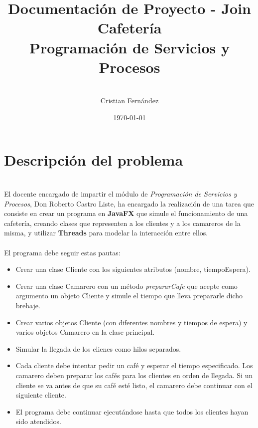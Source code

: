 \documentclass[12pt, a4paper, titlepage]{article}
\title{\LARGE \textbf{Documentación de Proyecto - Join Cafetería} \\[2ex] \Large Programación de Servicios y Procesos}
\author{\\[20ex]Cristian Fernández}
\date{\today}
\begin{document}
\maketitle

\doublespacing
\tableofcontents %
\newpage

\section{Descripción del problema}
\noindent \\El docente encargado de impartir el módulo de \textit{Programación de Servicios y Procesos}, Don Roberto Castro Liste,
ha encargado la realización de una tarea que consiste en crear un programa en \textbf{JavaFX} que simule el funcionamiento de una cafetería,
creando clases que representen a los clientes y a los camareros de la misma, y utilizar \textbf{Threads} para modelar la interacción entre ellos. \\ \\
El programa debe seguir estas pautas:\\
\begin{itemize}
    \item Crear una clase Cliente con los siguientes atributos (nombre, tiempoEspera).
    \item Crear una clase Camarero con un método \textit{prepararCafe} que acepte como argumento un objeto Cliente y simule el tiempo que lleva prepararle dicho brebaje.
    \item Crear varios objetos Cliente (con diferentes nombres y tiempos de espera) y varios objetos Camarero en la clase principal.
    \item Simular la llegada de los clienes como hilos separados.
    \item Cada cliente debe intentar pedir un café y esperar el tiempo especificado. Los camarero deben preparar los cafés para los clientes en orden de llegada. 
    Si un cliente se va antes de que su café esté listo, el camarero debe continuar con el siguiente cliente.
    \item El programa debe continuar ejecutándose hasta que todos los clientes hayan sido atendidos.
\end{itemize}
\newpage
\end{document}
